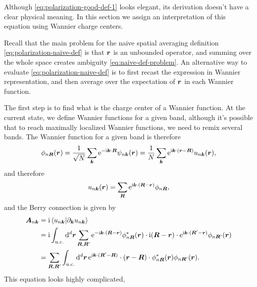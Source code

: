 \documentclass[hyperref, a4paper]{article}
\newcommand*{\ii}{\mathrm{i}}
\newcommand*{\ee}{\mathrm{e}}
\begin{document}
Although \eqref{eq:polarization-good-def-1} looks elegant, 
its derivation doesn't have a clear physical meaning.
In this section we assign an interpretation of this equation 
using Wannier charge centers. 

Recall that the main problem for the naive spatial averaging definition 
\eqref{eq:polarization-naive-def}
is that $\vb*{r}$ is an unbounded operator, 
and summing over the whole space 
creates ambiguity \eqref{eq:naive-def-problem}.
An alternative way to evaluate \eqref{eq:polarization-naive-def} 
is to first recast the expression 
in Wannier representation, 
and then average over the expectation of $\vb*{r}$ 
in each Wannier function.

The first step is to find what is the charge center of a Wannier function.
At the current state, 
we define Wannier functions for a given band, 
although it's possible that to reach maximally localized Wannier functions, 
we need to remix several bands.
The Wannier function for a given band is therefore 
\begin{equation}
    \phi_{n \vb*{R}}(\vb*{r}) = \frac{1}{\sqrt{N}} \sum_{\vb*{k}} \ee^{- \ii \vb*{k} \cdot \vb*{R}} \psi_{n \vb*{k}}(\vb*{r}) = \frac{1}{N} \sum_{\vb*{k}} \ee^{\ii \vb*{k} \cdot (\vb*{r} - \vb*{R})} u_{n \vb*{k}}(\vb*{r}),
\end{equation}
and therefore 
\begin{equation}
    u_{n \vb*{k}}(\vb*{r}) = \sum_{\vb*{R}} \ee^{\ii \vb*{k} \cdot (\vb*{R} - \vb*{r})} \phi_{n \vb*{R}},
\end{equation}
and the Berry connection is given by 
\begin{equation}
    \begin{aligned}
        \vb*{A}_{n \vb*{k}} &= \ii \braket*{u_{n \vb*{k}}}{\partial_{\vb*{k}} u_{n \vb*{k}}}  \\
        &= \ii \int_{\text{u.c.}} \dd[d]{\vb*{r}} 
        \sum_{\vb*{R}, \vb*{R}'} 
        \ee^{- \ii \vb*{k} \cdot (\vb*{R} - \vb*{r})} 
        \phi^*_{n \vb*{R}}(\vb*{r}) 
        \cdot \ii (\vb*{R} - \vb*{r}) \cdot 
        \ee^{\ii \vb*{k} \cdot (\vb*{R}' - \vb*{r})} 
        \phi_{n \vb*{R}'}(\vb*{r}) \\
        &= \sum_{\vb*{R}, \vb*{R}'} \int_{\text{u.c.}} \dd[d]{\vb*{r}}
        \ee^{\ii \vb*{k} \cdot (\vb*{R}' - \vb*{R})}
        \cdot (\vb*{r} - \vb*{R}) \cdot 
        \phi_{n \vb*{R}}^*(\vb*{r}) \phi_{n \vb*{R}'}(\vb*{r}) .
    \end{aligned}
\end{equation} 
This equation looks highly complicated, 
\end{document}
